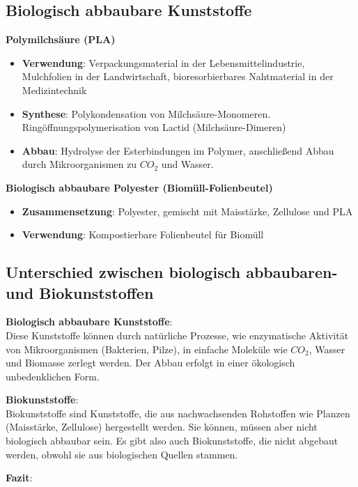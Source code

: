 \subsection{Biologisch abbaubare Kunststoffe}
\textbf{Polymilchsäure (PLA)}
\begin{itemize}
    \item \textbf{Verwendung}: Verpackungsmaterial in der Lebensmittelindustrie, Mulchfolien in der Landwirtschaft,
        bioresorbierbares Nahtmaterial in der Medizintechnik
    \item \textbf{Synthese}: Polykondensation von Milchsäure-Monomeren. \\
        Ringöffnungspolymerisation von Lactid (Milchsäure-Dimeren)
    \item \textbf{Abbau}: Hydrolyse der Esterbindungen im Polymer, anschließend Abbau durch Mikroorganismen zu $CO_2$ und Wasser.
\end{itemize}

\vspace{0.3cm}

\textbf{Biologisch abbaubare Polyester (Biomüll-Folienbeutel)}
\begin{itemize}
    \item \textbf{Zusammensetzung}: Polyester, gemischt mit Maisstärke, Zellulose und PLA
    \item \textbf{Verwendung}: Kompostierbare Folienbeutel für Biomüll
\end{itemize}

\vspace{0.3cm}

\subsection{Unterschied zwischen biologisch abbaubaren- und Biokunststoffen}

\textbf{Biologisch abbaubare Kunststoffe}: \\
Diese Kunststoffe können durch natürliche Prozesse, wie enzymatische Aktivität von Mikroorganismen (Bakterien, Pilze), in einfache Moleküle wie $CO_2$, Wasser und Biomasse zerlegt werden. 
Der Abbau erfolgt in einer ökologisch unbedenklichen Form.

\textbf{Biokunststoffe}: \\
Biokunststoffe sind Kunststoffe, die aus nachwachsenden Rohstoffen wie Planzen (Maisstärke, Zellulose) hergestellt werden.
Sie können, müssen aber nicht biologisch abbaubar sein. Es gibt also auch Biokunststoffe, die nicht abgebaut werden, obwohl sie aus biologischen Quellen stammen.

\textbf{Fazit}: \\

